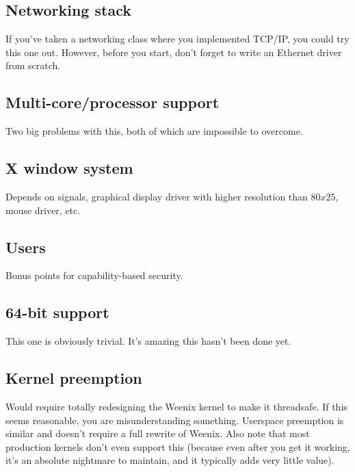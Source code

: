 \subsection{Networking stack}
If you've taken a networking class where you implemented TCP/IP, you could try this one out. However, before you start, don't forget to write an Ethernet driver from scratch.
\subsection{Multi-core/processor support}
Two big problems with this, both of which are impossible to overcome.
\subsection{X window system}
Depends on signals, graphical display driver with higher resolution than $80x25$, mouse driver, etc.
\subsection{Users}
Bonus points for capability-based security.
\subsection{64-bit support}
This one is obviously trivial. It's amazing this hasn't been done yet.
\subsection{Kernel preemption}
Would require totally redesigning the Weenix kernel to make it threadsafe. If this seems reasonable, you are misunderstanding something. Userspace preemption is similar and doesn't require a full rewrite of Weenix. Also note that most production kernels don't even support this (because even after you get it working, it's an absolute nightmare to maintain, and it typically adds very little value). %
 
